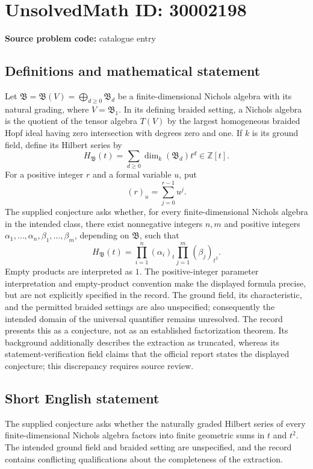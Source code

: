 \documentclass[11pt]{article}
\begin{document}
\section*{UnsolvedMath ID: 30002198}
\textbf{Source problem code:} catalogue entry
\subsection{Definitions and mathematical statement}
Let \(\mathfrak B=\mathfrak B(V)=\bigoplus_{d\geq 0}\mathfrak B_d\) be a finite-dimensional Nichols algebra with its natural grading, where \(V=\mathfrak B_1\). In its defining braided setting, a Nichols algebra is the quotient of the tensor algebra \(T(V)\) by the largest homogeneous braided Hopf ideal having zero intersection with degrees zero and one. If \(k\) is its ground field, define its Hilbert series by
\[
H_{\mathfrak B}(t)=\sum_{d\geq 0}\dim_k(\mathfrak B_d)t^d\in\mathbb Z[t].
\]
For a positive integer \(r\) and a formal variable \(u\), put
\[
(r)_u=\sum_{j=0}^{r-1}u^j.
\]
The supplied conjecture asks whether, for every finite-dimensional Nichols algebra in the intended class, there exist nonnegative integers \(n,m\) and positive integers \(\alpha_1,\ldots,\alpha_n,\beta_1,\ldots,\beta_m\), depending on \(\mathfrak B\), such that
\[
H_{\mathfrak B}(t)
=\prod_{i=1}^{n}(\alpha_i)_t
 \prod_{j=1}^{m}(\beta_j)_{t^2}.
\]
Empty products are interpreted as \(1\). The positive-integer parameter interpretation and empty-product convention make the displayed formula precise, but are not explicitly specified in the record. The ground field, its characteristic, and the permitted braided settings are also unspecified; consequently the intended domain of the universal quantifier remains unresolved. The record presents this as a conjecture, not as an established factorization theorem. Its background additionally describes the extraction as truncated, whereas its statement-verification field claims that the official report states the displayed conjecture; this discrepancy requires source review.
\subsection{Short English statement}
The supplied conjecture asks whether the naturally graded Hilbert series of every finite-dimensional Nichols algebra factors into finite geometric sums in \(t\) and \(t^2\). The intended ground field and braided setting are unspecified, and the record contains conflicting qualifications about the completeness of the extraction.
\end{document}
